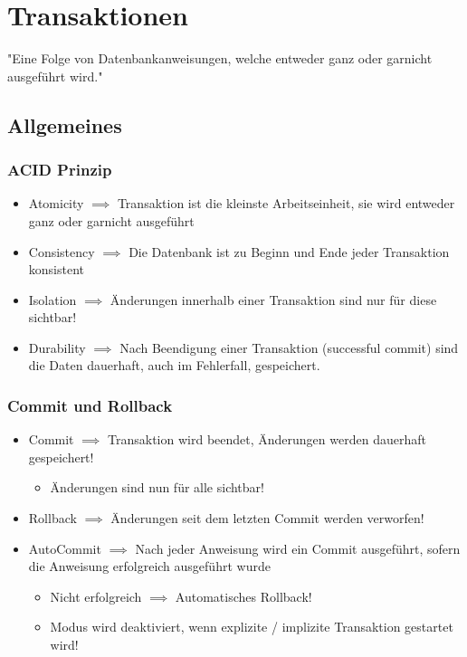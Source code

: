 \section{Transaktionen}
\begin{displayquote}
    "Eine Folge von Datenbankanweisungen, welche entweder ganz oder garnicht ausgeführt wird."
\end{displayquote}
\subsection{Allgemeines}
\subsubsection{ACID Prinzip}
\begin{itemize}
    \item Atomicity $\implies$ Transaktion ist die kleinste Arbeitseinheit, sie wird entweder ganz oder garnicht ausgeführt
    \item Consistency $\implies$ Die Datenbank ist zu Beginn und Ende jeder Transaktion konsistent
    \item Isolation $\implies$ Änderungen innerhalb einer Transaktion sind nur für diese sichtbar!
    \item Durability $\implies$ Nach Beendigung einer Transaktion (successful commit) sind die Daten dauerhaft, auch im Fehlerfall, gespeichert.
\end{itemize}
\subsubsection{Commit und Rollback}
\begin{itemize}
    \item Commit $\implies$ Transaktion wird beendet, Änderungen werden dauerhaft gespeichert!
    \begin{itemize}
        \item Änderungen sind nun für alle sichtbar!
    \end{itemize}
    \item Rollback $\implies$ Änderungen seit dem letzten Commit werden verworfen!
    \item AutoCommit $\implies$ Nach jeder Anweisung wird ein Commit ausgeführt, sofern die Anweisung erfolgreich ausgeführt wurde
    \begin{itemize}
        \item Nicht erfolgreich $\implies$ Automatisches Rollback!
        \item Modus wird deaktiviert, wenn explizite / implizite Transaktion gestartet wird! 
    \end{itemize}
\end{itemize}
